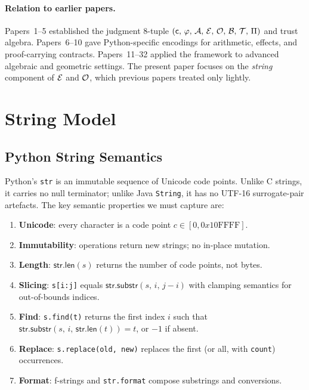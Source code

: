 \documentclass[11pt]{article}
\newcommand{\strlen}[1]{\ensuremath{\mathsf{str.len}(#1)}}
\newcommand{\strsubstr}[3]{\ensuremath{\mathsf{str.substr}(#1,\,#2,\,#3)}}
\begin{document}
\paragraph{Relation to earlier papers.}
Papers~1--5 established the judgment 8-tuple $\Jud{\coord}{\prop}{\carrier}%
{\evid}{\oblig}{\obstr}{\trust}{\prov}$ and trust algebra.  Papers~6--10
gave Python-specific encodings for arithmetic, effects, and proof-carrying
contracts.  Papers~11--32 applied the framework to advanced algebraic and
geometric settings.  The present paper focuses on the \emph{string} component
of $\mathcal{E}$ and $\mathcal{O}$, which previous papers treated only lightly.

\section{String Model}
\label{sec:model}

\subsection{Python String Semantics}
\label{sec:py-str}

Python's \texttt{str} is an immutable sequence of Unicode code points.
Unlike C strings, it carries no null terminator; unlike Java \texttt{String},
it has no UTF-16 surrogate-pair artefacts.  The key semantic properties we
must capture are:

\begin{enumerate}
  \item \textbf{Unicode}: every character is a code point
    $c \in [0, 0x10\mathrm{FFFF}]$.
  \item \textbf{Immutability}: operations return new strings; no in-place
    mutation.
  \item \textbf{Length}: $\strlen{s}$ returns the number of code points, not
    bytes.
  \item \textbf{Slicing}: \texttt{s[i:j]} equals
    $\strsubstr{s}{i}{j - i}$ with clamping semantics for out-of-bounds
    indices.
  \item \textbf{Find}: \texttt{s.find(t)} returns the first index $i$ such
    that $\strsubstr{s}{i}{\strlen{t}} = t$, or $-1$ if absent.
  \item \textbf{Replace}: \texttt{s.replace(old, new)} replaces the first
    (or all, with \texttt{count}) occurrences.
  \item \textbf{Format}: f-strings and \texttt{str.format} compose substrings
    and conversions.
\end{enumerate}
\end{document}
